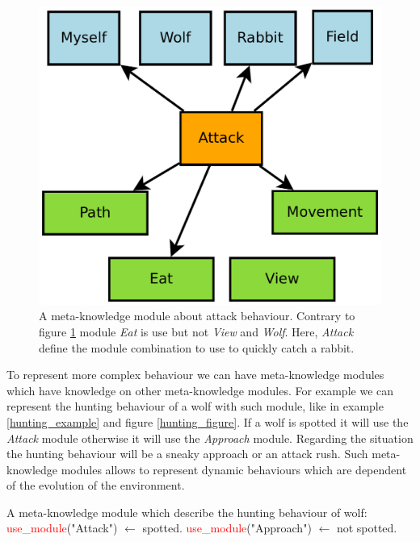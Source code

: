 \documentclass{aamas2012}
\begin{document}
	\begin{figure}
		\centering
		\includegraphics[keepaspectratio=true, scale=0.3]{attack_behaviour.pdf}
		\caption
		{
			\label{approach_figure}
			A meta-knowledge module about attack behaviour.
			Contrary to figure \ref{approach_figure} module \emph{Eat} is use but not \emph{View} and \emph{Wolf}.
			Here, \emph{Attack} define the module combination to use to quickly catch a rabbit.
		}
	\end{figure}
	
	To represent more complex behaviour we can have meta-knowledge modules which have knowledge on other meta-knowledge modules.
	For example we can represent the hunting behaviour of a wolf with such module, like in example \ref{hunting_example} and figure \ref{hunting_figure}.
	If a wolf is spotted it will use the \emph{Attack} module otherwise it will use the \emph{Approach} module.
	Regarding the situation the hunting behaviour will be a sneaky approach or an attack rush.
	Such meta-knowledge modules allows to represent dynamic behaviours which are dependent of the evolution of the environment.
	
	\begin{example}
		\label{hunting_example}
		A meta-knowledge module which describe the hunting behaviour of wolf:\newline
		\newline
		\textcolor{red}{use\_module}("Attack") $\leftarrow$ spotted.\newline
		\textcolor{red}{use\_module}("Approach") $\leftarrow$ not spotted.\newline
	\end{example}
	
\end{document}
